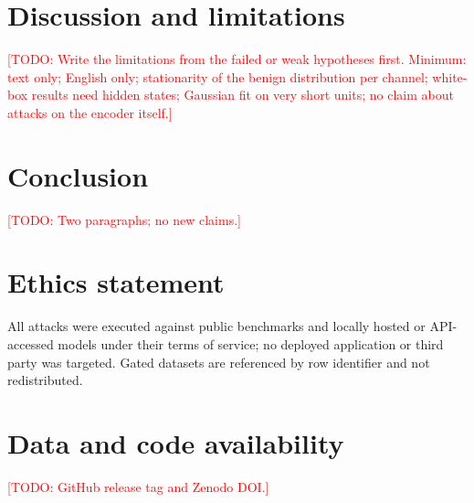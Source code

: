 \documentclass[review,12pt]{elsarticle}
\newcommand{\TODO}[1]{\textcolor{red}{[TODO: #1]}}
\begin{document}
\section{Discussion and limitations}\label{sec:discussion}
\TODO{Write the limitations from the failed or weak hypotheses first. Minimum: text only; English only;
stationarity of the benign distribution per channel; white-box results need hidden states; Gaussian fit on
very short units; no claim about attacks on the encoder itself.}

\section{Conclusion}\TODO{Two paragraphs; no new claims.}

\section*{Ethics statement}
All attacks were executed against public benchmarks and locally hosted or API-accessed models under their
terms of service; no deployed application or third party was targeted. Gated datasets are referenced by row
identifier and not redistributed.

\section*{Data and code availability}
\TODO{GitHub release tag and Zenodo DOI.}



\end{document}
